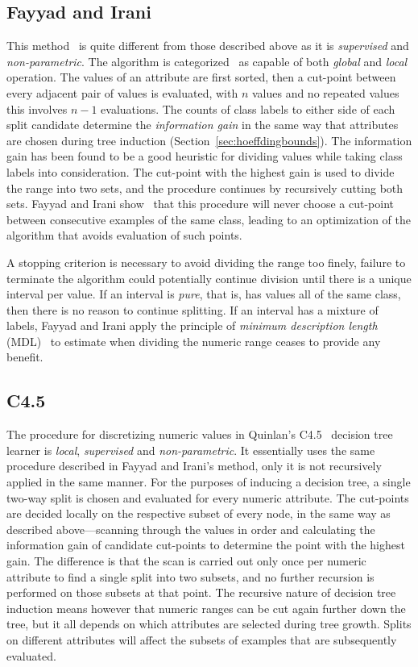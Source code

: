 \subsection{Fayyad and Irani}

This method~\cite{fayyadirani} is quite different from those described above as it is {\em supervised} and {\em non-parametric}. The algorithm is categorized~\cite{discretize} as capable of both {\em global} and {\em local} operation. The values of an attribute are first sorted, then a cut-point between every adjacent pair of values is evaluated, with $n$ values and no repeated values this involves $n-1$ evaluations. The counts of class labels to either side of each split candidate determine the {\em information gain} in the same way that attributes are chosen during tree induction (Section~\ref{sec:hoeffdingbounds}). The information gain has been found to be a good heuristic for dividing values while taking class labels into consideration. The cut-point with the highest gain is used to divide the range into two sets, and the procedure continues by recursively cutting both sets.  Fayyad and Irani show~\cite{fayyadirani} that this procedure will never choose a cut-point between consecutive examples of the same class, leading to an optimization of the algorithm that avoids evaluation of such points.

A stopping criterion is necessary to avoid dividing the range too finely, failure to terminate the algorithm could potentially continue division until there is a unique interval per value. If an interval is {\em pure}, that is, has values all of the same class, then there is no reason to continue splitting. If an interval has a mixture of labels, Fayyad and Irani apply the principle of {\em minimum description length} (MDL)~\cite{mdl} to estimate when dividing the numeric range ceases to provide any benefit.

\subsection{C4.5}

The procedure for discretizing numeric values in Quinlan's C4.5~\cite{c4.5} decision tree learner is {\em local}, {\em supervised} and {\em non-parametric}. It essentially uses the same procedure described in Fayyad and Irani's method, only it is not recursively applied in the same manner. For the purposes of inducing a decision tree, a single two-way split is chosen and evaluated for every numeric attribute. The cut-points are decided locally on the respective subset of every node, in the same way as described above---scanning through the values in order and calculating the information gain of candidate cut-points to determine the point with the highest gain. The difference is that the scan is carried out only once per numeric attribute to find a single split into two subsets, and no further recursion is performed on those subsets at that point. The recursive nature of decision tree induction means however that numeric ranges can be cut again further down the tree, but it all depends on which attributes are selected during tree growth. Splits on different attributes will affect the subsets of examples that are subsequently evaluated.

